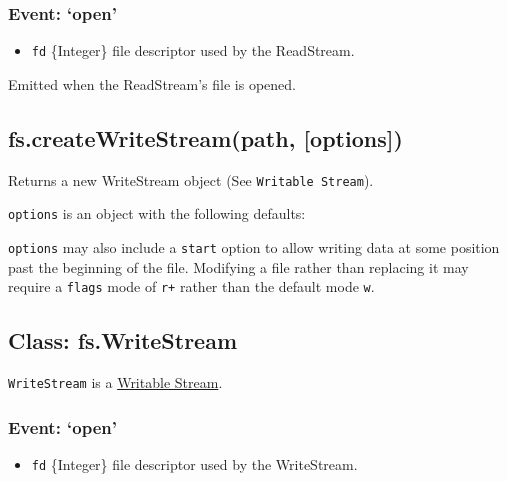 \subsubsection{Event: `open'}

\begin{itemize}
\item
  \texttt{fd} \{Integer\} file descriptor used by the ReadStream.
\end{itemize}

Emitted when the ReadStream's file is opened.

\subsection{fs.createWriteStream(path, {[}options{]})}

Returns a new WriteStream object (See \texttt{Writable Stream}).

\texttt{options} is an object with the following defaults:

\begin{Shaded}
\begin{Highlighting}[]
\NormalTok{\{ }\NormalTok{: }\NormalTok{,}
  \NormalTok{: } \NormalTok{\}}
\end{Highlighting}
\end{Shaded}

\texttt{options} may also include a \texttt{start} option to allow
writing data at some position past the beginning of the file. Modifying
a file rather than replacing it may require a \texttt{flags} mode of
\texttt{r+} rather than the default mode \texttt{w}.

\subsection{Class: fs.WriteStream}

\texttt{WriteStream} is a
\href{stream.html\#stream\_class\_stream\_writable}{Writable Stream}.

\subsubsection{Event: `open'}

\begin{itemize}
\item
  \texttt{fd} \{Integer\} file descriptor used by the WriteStream.
\end{itemize}

